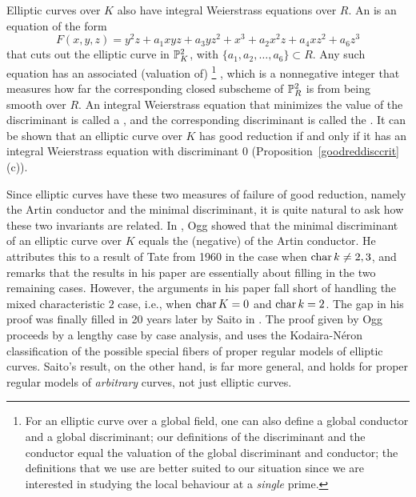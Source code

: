 Elliptic curves over $K$ also have integral Weierstrass equations over $R$. An {} is an equation of the form 
\[ F(x,y,z) = y^2z+a_1xyz+a_3yz^2+x^3+a_2x^2z+a_4xz^2+a_6z^3 \]
that cuts out the elliptic curve in $\P^2_K$, with $\{a_1,a_2,\ldots,a_6\} \subset R$. 
Any such equation has an associated (valuation of) {}{\footnote{For an elliptic curve over a global field, one can also define a global conductor and a global discriminant; our definitions of the discriminant and the conductor equal the valuation of the global discriminant and conductor; the definitions that we use are better suited to our situation since we are interested in studying the local behaviour at a {\textit{single}} prime.}} \cite[p.42, Section III.1]{babysil}, which is a nonnegative integer that measures how far the corresponding closed subscheme of $\P^2_R$ is from being smooth over $R$. An integral Weierstrass equation that minimizes the value of the discriminant is called a {}, and the corresponding discriminant is called the {}. It can be shown that an elliptic curve over $K$ has good reduction if and only if it has an integral Weierstrass equation with discriminant $0$ (Proposition~\ref{goodreddisccrit}\textup{(c)}). 

Since elliptic curves have these two measures of failure of good reduction, namely the Artin conductor and the minimal discriminant, it is quite natural to ask how these two invariants are related. In \cite{ogg}, Ogg showed that the minimal discriminant of an elliptic curve over $K$ equals the (negative) of the Artin conductor. He attributes this to a result of Tate from 1960 in the case when $\cha k \neq 2,3$, and remarks that the results in his paper are essentially about filling in the two remaining cases. However, the arguments in his paper fall short of handling the mixed characteristic $2$ case, i.e., when $\cha K = 0$ and $\cha k = 2$. The gap in his proof was finally filled in 20 years later by Saito in \cite{saito2}. The proof given by Ogg proceeds by a lengthy case by case analysis, and uses the Kodaira-N\'{e}ron classification of the possible special fibers of proper regular models of elliptic curves. 
Saito's result, on the other hand, is far more general, and holds for proper regular models of {\textit{arbitrary}} curves, not just elliptic curves. 

